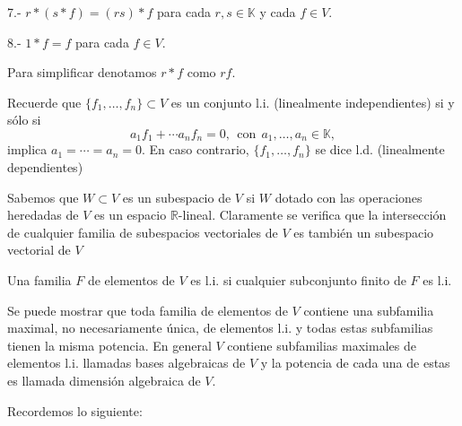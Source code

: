 \documentclass[twoside,12pt,a4 paper,openright]{book}
\begin{document}
7.- $r*(s* f) =(rs)* f  $ para cada $r,s\in \mathbb K$ y cada $f\in V$.

8.- $1*f= f$ para cada $f\in V$.

Para simplificar denotamos $r*f$ como $rf$.



Recuerde que  $\{ f_1,\dots, f_n \} \subset V$  es un conjunto l.i. (linealmente independientes) si y s\'olo si 
$$ a_1 f_1+ \cdots a_n f_n = 0
 , \ \   \textrm{con} \  \  a_1, \dots, a_n \in \mathbb K ,$$  implica $a_1= \cdots= a_n =0$. En caso contrario, $\{ f_1,\dots, f_n \}$  se dice l.d. (linealmente  dependientes)



Sabemos que $W\subset V$ es un subespacio de $V$ si $W $ dotado con las operaciones heredadas de $V$ es un espacio $\mathbb R$-lineal. Claramente se verifica que la intersecci\'on de cualquier familia  de subespacios vectoriales de  $V$  es tambi\'en un subespacio vectorial de $V$ 





Una familia $F$ de elementos de $V$ es  l.i. si cualquier subconjunto finito de $F$ es l.i.


Se puede mostrar que toda familia de elementos de $V$ contiene una subfamilia maximal, no necesariamente \'unica, de elementos l.i. y todas estas subfamilias tienen la misma potencia. En general $V$    contiene  subfamilias maximales  de elementos l.i. llamadas  bases algebraicas de $V$ y la potencia de cada una de estas es llamada dimensi\'on algebraica de  $V$. 

 

Recordemos lo siguiente: 
\end{document}
